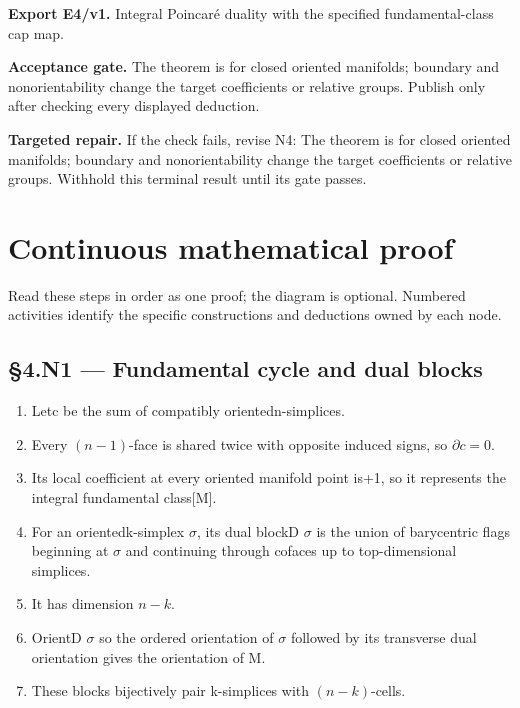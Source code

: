 \documentclass[preprint,12pt,aps,pra,showkeys,amsmath,amssymb,superscriptaddress,floatfix]{revtex4-2}
\theoremstyle{definition}
\theoremstyle{remark}
\newcommand{\field}[2]{\par\smallskip\noindent\textbf{#1.} #2\par}
\begin{document}
\field{Export E4/v1}{Integral Poincaré duality with the specified fundamental-class cap map.}

\field{Acceptance gate}{The theorem is for closed oriented manifolds; boundary and
nonorientability change the target coefficients or relative groups.
Publish only after checking every displayed deduction.}

\field{Targeted repair}{If the check fails, revise N4: The theorem is for closed oriented
manifolds; boundary and nonorientability change the target coefficients
or relative groups. Withhold this terminal result until its gate passes.}

\endgroup\clearpage\section{Continuous mathematical proof}\label{sec:proof}

Read these steps in order as one proof; the diagram is optional.
Numbered activities identify the specific constructions and deductions
owned by each node.

\subsection{§4.N1 --- Fundamental cycle and dual
blocks}\label{n1-fundamental-cycle-and-dual-blocks}

\begin{enumerate}
\def\labelenumi{\arabic{enumi}.}
\item
  Letc be the sum of compatibly orientedn-simplices.
\item
  Every \((n-1)\)-face is shared twice with opposite induced signs, so
  \(\partial c=0\).
\item
  Its local coefficient at every oriented manifold point is+1, so it
  represents the integral fundamental class{[}M{]}.
\item
  For an orientedk-simplex \(\sigma\), its dual blockD \(\sigma\) is the
  union of barycentric flags beginning at \(\sigma\) and continuing
  through cofaces up to top-dimensional simplices.
\item
  It has dimension \(n-k\).
\item
  OrientD \(\sigma\) so the ordered orientation of \(\sigma\) followed
  by its transverse dual orientation gives the orientation of M.
\item
  These blocks bijectively pair k-simplices with \((n-k)\)-cells.
\end{enumerate}
\end{document}
